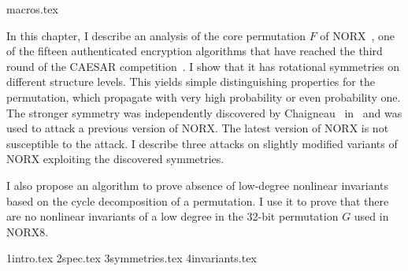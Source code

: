 \myminitoc

{macros.tex}

In this chapter, I describe an analysis of the core permutation $F$ of NORX~\cite{NORX}, one of the fifteen authenticated encryption algorithms that have reached the third round of the CAESAR competition~\cite{CAESAR}. I show that it has rotational symmetries on different structure levels. This yields simple distinguishing properties for the permutation, which propagate with very high probability or even probability one. The stronger symmetry was independently discovered by Chaigneau~\etal{} in~\cite{NORXfse} and was used to attack a previous version of NORX. The latest version of NORX is not susceptible to the attack. I describe three attacks on slightly modified variants of NORX exploiting the discovered symmetries.

I also propose an algorithm to prove absence of low-degree nonlinear invariants based on the cycle decomposition of a permutation. I use it to prove that there are no nonlinear invariants of a low degree in the 32-bit permutation $G$ used in NORX8.

{1intro.tex}
{2spec.tex}
{3symmetries.tex}
{4invariants.tex}